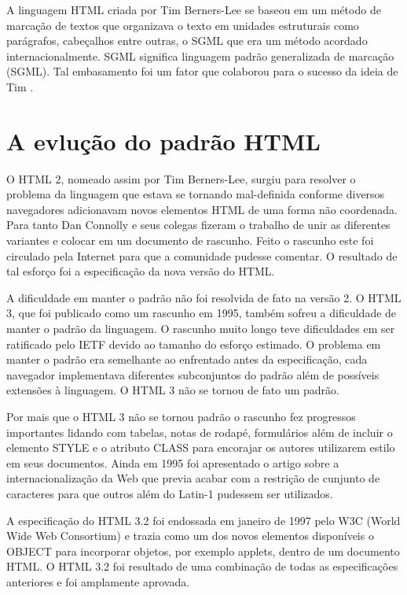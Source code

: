 A linguagem HTML criada por Tim Berners-Lee se baseou em um método de marcação de textos que organizava o texto em unidades estruturais como parágrafos, cabeçalhos entre outras, o SGML que era um método acordado internacionalmente. SGML significa linguagem padrão generalizada de marcação (SGML). Tal embasamento foi um fator que colaborou para o sucesso da ideia de Tim \cite{htmlHist}.

\section{A evlução do padrão HTML}
O HTML 2, nomeado assim por Tim Berners-Lee, surgiu para resolver o problema da linguagem que estava se tornando mal-definida conforme diversos navegadores adicionavam novos elementos HTML de uma forma não coordenada. Para tanto Dan Connolly e seus colegas fizeram o trabalho de unir as diferentes variantes e colocar em um documento de rascunho. Feito o rascunho este foi circulado pela Internet para que a comunidade pudesse comentar. O resultado de tal esforço foi a especificação da nova versão do HTML.

A dificuldade em manter o padrão não foi resolvida de fato na versão 2. O HTML 3, que foi publicado como um rascunho em 1995, também sofreu a dificuldade de manter o padrão da linguagem. O rascunho muito longo teve dificuldades em ser ratificado pelo IETF devido ao tamanho do esforço estimado. O problema em manter o padrão era semelhante ao enfrentado antes da especificação, cada navegador implementava diferentes subconjuntos do padrão além de possíveis extensões à linguagem. O HTML 3 não se tornou de fato um padrão.

Por mais que o HTML 3 não se tornou padrão o rascunho fez progressos importantes lidando com tabelas, notas de rodapé, formulários além de incluir o elemento STYLE e o atributo CLASS para encorajar os autores utilizarem estilo em seus documentos. Ainda em 1995 foi apresentado o artigo sobre a internacionalização da Web que previa acabar com a restrição de cunjunto de caracteres para que outros além do Latin-1 pudessem ser utilizados.

A especificação do HTML 3.2 foi endossada em janeiro de 1997 pelo W3C (World Wide Web Consortium) e trazia como um dos novos elementos disponíveis o OBJECT para incorporar objetos, por exemplo applets, dentro de um documento HTML. O HTML 3.2 foi resultado de uma combinação de todas as especificações anteriores e foi amplamente aprovada. \cite{htmlHist}

